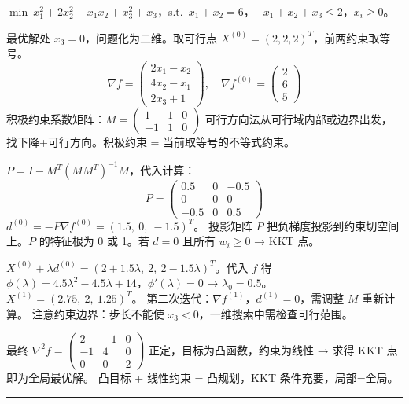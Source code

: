 \noindent $\min\ x_1^2+2x_2^2-x_1x_2+x_3^2+x_3$，s.t.\ $x_1+x_2=6$，$-x_1+x_2+x_3\le 2$，$x_i\ge 0$。

  {最优解处 $x_3=0$，问题化为二维。取可行点 $X^{(0)} = (2,2,2)^T$，前两约束取等号。
  \[
  \nabla f = \begin{pmatrix} 2x_1-x_2 \\ 4x_2-x_1 \\ 2x_3+1 \end{pmatrix},\quad
  \nabla f^{(0)} = \begin{pmatrix} 2 \\ 6 \\ 5 \end{pmatrix}
  \]
  积极约束系数矩阵：$M = \begin{pmatrix}1&1&0\\-1&1&0\end{pmatrix}$}
  {可行方向法从可行域内部或边界出发，找下降+可行方向。积极约束 = 当前取等号的不等式约束。}
  {\par\vspace{4pt}}
  {$P = I - M^T(MM^T)^{-1}M$，代入计算：
  \[
  P = \begin{pmatrix}0.5&0&-0.5\\0&0&0\\-0.5&0&0.5\end{pmatrix}
  \]
  $d^{(0)} = -P\nabla f^{(0)} = (1.5,\ 0,\ -1.5)^T$。}
  {投影矩阵 $P$ 把负梯度投影到约束切空间上。$P$ 的特征根为 0 或 1。若 $d=0$ 且所有 $w_i\ge 0$ → KKT 点。}
  {\par\vspace{4pt}}
  {$X^{(0)} + \lambda d^{(0)} = (2+1.5\lambda,\ 2,\ 2-1.5\lambda)^T$。代入 $f$ 得 $\phi(\lambda)=4.5\lambda^2-4.5\lambda+14$，$\phi'(\lambda)=0$ → $\lambda_0=0.5$。\\
  $X^{(1)} = (2.75,\ 2,\ 1.25)^T$。
  第二次迭代：$\nabla f^{(1)}$，$d^{(1)}=0$，需调整 $M$ 重新计算。}
  {注意约束边界：步长不能使 $x_3<0$，一维搜索中需检查可行范围。}
  {\par\vspace{4pt}}
  {最终 $\nabla^2 f = \begin{pmatrix}2&-1&0\\-1&4&0\\0&0&2\end{pmatrix}$ 正定，目标为凸函数，约束为线性 → 求得 KKT 点即为全局最优解。}
  {凸目标 + 线性约束 = 凸规划，KKT 条件充要，局部=全局。}
  {}\rule{\textwidth}{0.4pt}

